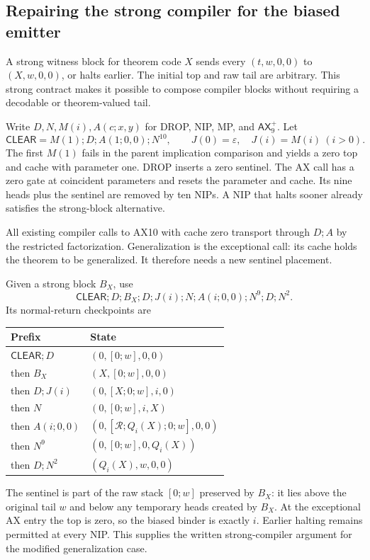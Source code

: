 \documentclass[11pt]{article}
\newcommand{\AX}{\mathsf{AX}}
\begin{document}
\subsection{Repairing the strong compiler for the biased emitter}

A strong witness block for theorem code $X$ sends every $(t,w,0,0)$ to $(X,w,0,0)$, or halts earlier. The initial top and raw tail are arbitrary. This strong contract makes it possible to compose compiler blocks without requiring a decodable or theorem-valued tail.

Write $D,N,M(i),A(c;x,y)$ for DROP, NIP, MP, and $\AX_9^+$. Let
\[
 \mathsf{CLEAR}=M(1);D;A(1;0,0);N^{10},\qquad
 J(0)=\varepsilon,\quad J(i)=M(i)\ (i>0).
\]
The first $M(1)$ fails in the parent implication comparison and yields a zero top and cache with parameter one. DROP inserts a zero sentinel. The AX call has a zero gate at coincident parameters and resets the parameter and cache. Its nine heads plus the sentinel are removed by ten NIPs. A NIP that halts sooner already satisfies the strong-block alternative.

All existing compiler calls to AX10 with cache zero transport through $D;A$ by the restricted factorization. Generalization is the exceptional call: its cache holds the theorem to be generalized. It therefore needs a new sentinel placement.

Given a strong block $B_X$, use
\[
 \mathsf{CLEAR};D;B_X;D;J(i);N;A(i;0,0);N^9;D;N^2.
\]
Its normal-return checkpoints are
\begin{center}\small
\begin{tabular}{@{}ll@{}}
\toprule
Prefix & State\\
\midrule
$\mathsf{CLEAR};D$ & $(0,[0;w],0,0)$\\
then $B_X$ & $(X,[0;w],0,0)$\\
then $D;J(i)$ & $(0,[X;0;w],i,0)$\\
then $N$ & $(0,[0;w],i,X)$\\
then $A(i;0,0)$ & $(0,[\mathcal R;Q_i(X);0;w],0,0)$\\
then $N^9$ & $(0,[0;w],0,Q_i(X))$\\
then $D;N^2$ & $(Q_i(X),w,0,0)$\\
\bottomrule
\end{tabular}
\end{center}
The sentinel is part of the raw stack $[0;w]$ preserved by $B_X$: it lies above the original tail $w$ and below any temporary heads created by $B_X$. At the exceptional AX entry the top is zero, so the biased binder is exactly $i$. Earlier halting remains permitted at every NIP. This supplies the written strong-compiler argument for the modified generalization case.
\end{document}
